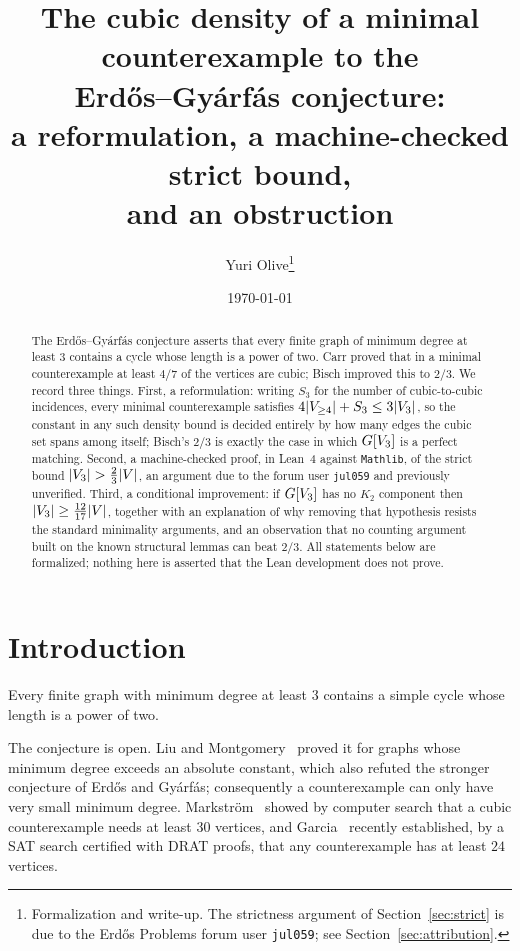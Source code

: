 \documentclass[11pt,a4paper]{article}
\title{The cubic density of a minimal counterexample to the\\
Erd\H{o}s--Gy\'arf\'as conjecture:\\
a reformulation, a machine-checked strict bound,\\
and an obstruction}
\author{Yuri Olive\thanks{Formalization and write-up. The strictness argument of
Section~\ref{sec:strict} is due to the Erd\H{o}s Problems forum user \texttt{jul059};
see Section~\ref{sec:attribution}.}}
\date{\today}
\begin{document}
\maketitle

\begin{abstract}
The Erd\H{o}s--Gy\'arf\'as conjecture asserts that every finite graph of minimum degree at
least $3$ contains a cycle whose length is a power of two. Carr proved that in a minimal
counterexample at least $4/7$ of the vertices are cubic; Bisch improved this to $2/3$. We
record three things. First, a reformulation: writing $S_3$ for the number of
cubic-to-cubic incidences, every minimal counterexample satisfies
$4\lvert V_{\ge 4} \rvert + S_3 \le 3\lvert V_{3} \rvert$, so the constant in any such density bound is
decided entirely by how many edges the cubic set spans among itself; Bisch's $2/3$ is
exactly the case in which $G[V_{3}]$ is a perfect matching. Second, a machine-checked
proof, in Lean~4 against \texttt{Mathlib}, of the strict bound
$\lvert V_{3} \rvert > \tfrac{2}{3}\lvert V \rvert$, an argument due to the forum user
\texttt{jul059} and previously unverified. Third, a conditional improvement: if
$G[V_{3}]$ has no $K_2$ component then $\lvert V_{3} \rvert \ge \tfrac{12}{17}\lvert V \rvert$,
together with an explanation of why removing that hypothesis resists the standard
minimality arguments, and an observation that no counting argument built on the known
structural lemmas can beat $2/3$. All statements below are formalized; nothing here is
asserted that the Lean development does not prove.
\end{abstract}

\section{Introduction}

\begin{conjecture}
Every finite graph with minimum degree at least $3$ contains a simple cycle whose length is
a power of two.
\end{conjecture}

The conjecture is open. Liu and Montgomery~\cite{LiuMontgomery} proved it for graphs whose
minimum degree exceeds an absolute constant, which also refuted the stronger conjecture of
Erd\H{o}s and Gy\'arf\'as; consequently a counterexample can only have very small minimum
degree. Markstr\"om~\cite{Markstrom} showed by computer search that a cubic counterexample
needs at least $30$ vertices, and Garcia~\cite{Garcia} recently established, by a
SAT search certified with DRAT proofs, that any counterexample has at least $24$ vertices.
\end{document}
